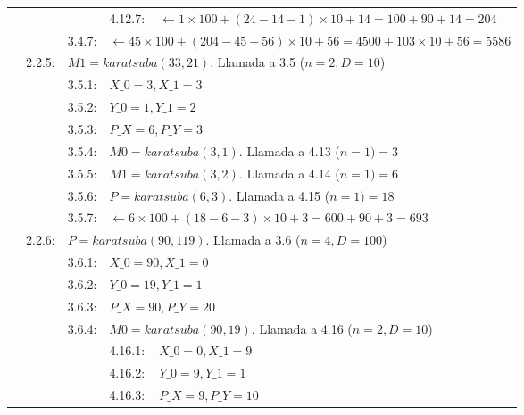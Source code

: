 \documentclass[titlepage,a4paper]{article}
\begin{document}
\begin{longtable}[r]{lllllll}
\multicolumn{4}{l}{}     & 4.12.7:     & \multicolumn{2}{l}{$\leftarrow 1\times 100 + (24-14-1)\times 10 + 14 =  100 + 90 + 14 = \boxed{204}$}     \\
\multicolumn{3}{l}{}     & 3.4.7:     & \multicolumn{3}{l}{$\leftarrow 45\times 100 + (204-45-56)\times 10 + 56 =  4500 + 103\times 10 + 56 = \boxed{5586}$}     \\
\multicolumn{2}{l}{}     & 2.2.5:     & \multicolumn{4}{l}{$M1=karatsuba(33,21)$. Llamada a 3.5 ($n=2,D=10$)}     \\
\multicolumn{3}{l}{}     & 3.5.1:     & \multicolumn{3}{l}{$X\_0=3, X\_1=3$}     \\
\multicolumn{3}{l}{}     & 3.5.2:     & \multicolumn{3}{l}{$Y\_0=1, Y\_1=2$}     \\
\multicolumn{3}{l}{}     & 3.5.3:     & \multicolumn{3}{l}{$P\_X=6, P\_Y=3$}     \\
\multicolumn{3}{l}{}     & 3.5.4:     & \multicolumn{3}{l}{$M0=karatsuba(3,1)$. Llamada a 4.13 ($n=1) = \boxed{3}$}     \\
\multicolumn{3}{l}{}     & 3.5.5:     & \multicolumn{3}{l}{$M1=karatsuba(3,2)$. Llamada a 4.14 ($n=1) = \boxed{6}$}     \\
\multicolumn{3}{l}{}     & 3.5.6:     & \multicolumn{3}{l}{$P=karatsuba(6,3)$. Llamada a 4.15 ($n=1) = \boxed{18}$}     \\
\multicolumn{3}{l}{}     & 3.5.7:     & \multicolumn{3}{l}{$\leftarrow 6\times 100 + (18-6-3)\times 10 + 3 =  600 + 90 + 3 = \boxed{693}$}     \\
\multicolumn{2}{l}{}     & 2.2.6:     & \multicolumn{4}{l}{$P=karatsuba(90,119)$. Llamada a 3.6 ($n=4,D=100$)}     \\
\multicolumn{3}{l}{}     & 3.6.1:     & \multicolumn{3}{l}{$X\_0=90, X\_1=0$}     \\
\multicolumn{3}{l}{}     & 3.6.2:     & \multicolumn{3}{l}{$Y\_0=19, Y\_1=1$}     \\
\multicolumn{3}{l}{}     & 3.6.3:     & \multicolumn{3}{l}{$P\_X=90, P\_Y=20$}     \\
\multicolumn{3}{l}{}     & 3.6.4:     & \multicolumn{3}{l}{$M0=karatsuba(90,19)$. Llamada a 4.16 ($n=2,D=10$)}     \\
\multicolumn{4}{l}{}     & 4.16.1:     & \multicolumn{2}{l}{$X\_0=0, X\_1=9$}     \\
\multicolumn{4}{l}{}     & 4.16.2:     & \multicolumn{2}{l}{$Y\_0=9, Y\_1=1$}     \\
\multicolumn{4}{l}{}     & 4.16.3:     & \multicolumn{2}{l}{$P\_X=9, P\_Y=10$}     \\

\end{longtable}
\end{document}
